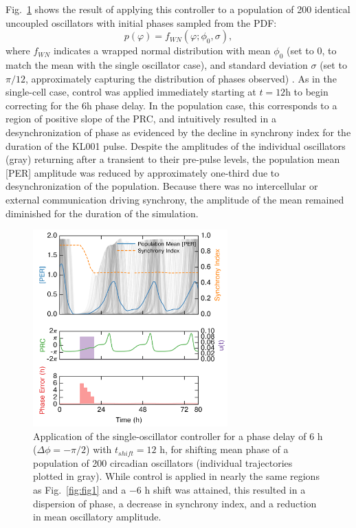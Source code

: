 Fig.~\ref{fig:fig3} shows the result of applying this controller to a population of 200 identical uncoupled oscillators with initial phases sampled from the PDF:
\begin{equation}\label{eq:wnbsol}
    p(\varphi) = f_{WN}(\varphi; \phi_0, \sigma),
\end{equation}
where $f_{WN}$ indicates a wrapped normal distribution with mean $\phi_0$ (set to $0$, to match the mean with the single oscillator case), and standard deviation $\sigma$ (set to $\pi/12$, approximately capturing the distribution of phases observed) \cite{StJohn2014b}.
As in the single-cell case, control was applied immediately starting at $t=12$h to begin correcting for the $6$h phase delay.
In the population case, this corresponds to a region of positive slope of the PRC, and intuitively resulted in a desynchronization of phase as evidenced by the decline in synchrony index for the duration of the KL001 pulse.
Despite the amplitudes of the individual oscillators (gray) returning after a transient to their pre-pulse levels, the population mean [PER] amplitude was reduced by approximately one-third due to desynchronization of the population.
Because there was no intercellular or external communication driving synchrony, the amplitude of the mean remained diminished for the duration of the simulation.

\begin{figure}[p]
    \begin{center}
\includegraphics[width=7.5cm]{chap7/figures/fig3_population.png}
\end{center}
\caption{Application of the single-oscillator controller for a phase delay of $6$ h ($\Delta\phi = -\pi/2$) with $t_{shift} = 12$ h, for shifting mean phase of a population of 200 circadian oscillators (individual trajectories plotted in gray). While control is applied in nearly the same regions as Fig.~\ref{fig:fig1} and a $-6$ h shift was attained, this resulted in a dispersion of phase, a decrease in synchrony index, and a reduction in mean oscillatory amplitude.}
\label{fig:fig3}       %
\end{figure}

